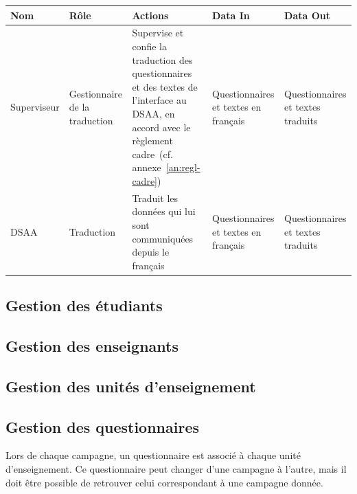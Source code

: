 \documentclass[a4paper,11pt]{report}
\begin{document}
\begin{tabularx}{\linewidth}{|X|X|X|X|X|} \hline
Nom & Rôle & Actions & Data In & Data Out \\ \hline 
Superviseur & Gestionnaire de la traduction & Supervise et confie la traduction des questionnaires et des textes de l'interface au DSAA, en accord avec le règlement cadre~(cf. annexe~\ref{an:regl-cadre}) & Questionnaires et textes en français & Questionnaires et textes traduits \\ 
DSAA & Traduction & Traduit les données qui lui sont communiquées depuis le français & Questionnaires et textes en français & Questionnaires et textes traduits \\ \hline
\end{tabularx}





\subsection{Gestion des étudiants}




\subsection{Gestion des enseignants}




\subsection{Gestion des unités d'enseignement}





\subsection{Gestion des questionnaires}
Lors de chaque campagne, un questionnaire est associé à chaque unité d'enseignement.
Ce questionnaire peut changer d'une campagne à l'autre, mais il doit être possible de retrouver celui correspondant à une campagne donnée.
\end{document}
